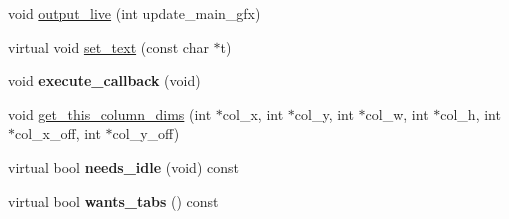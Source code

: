 \begin{DoxyCompactItemize}
\item 
void \hyperlink{class_g_l_u_i___control_ac7417112964d4c5134d4453835a0da99}{output\+\_\+live} (int update\+\_\+main\+\_\+gfx)
\item 
virtual void \hyperlink{class_g_l_u_i___control_a44fab5a8af3c58865bc2cd8bfd596af8}{set\+\_\+text} (const char $\ast$t)
\item 
\hypertarget{class_g_l_u_i___control_a76fe9cee85c7a296610a73b0ba12aa9c}{void {\bfseries execute\+\_\+callback} (void)}\label{class_g_l_u_i___control_a76fe9cee85c7a296610a73b0ba12aa9c}

\item 
void \hyperlink{class_g_l_u_i___control_a0cb273fd3dca9fb84809a4d350668c32}{get\+\_\+this\+\_\+column\+\_\+dims} (int $\ast$col\+\_\+x, int $\ast$col\+\_\+y, int $\ast$col\+\_\+w, int $\ast$col\+\_\+h, int $\ast$col\+\_\+x\+\_\+off, int $\ast$col\+\_\+y\+\_\+off)
\item 
\hypertarget{class_g_l_u_i___control_aab6d8bb823a01dc13892e68b796ef29c}{virtual bool {\bfseries needs\+\_\+idle} (void) const }\label{class_g_l_u_i___control_aab6d8bb823a01dc13892e68b796ef29c}

\item 
\hypertarget{class_g_l_u_i___control_a42a65c9dbc0690e270a8c0033fbc1845}{virtual bool {\bfseries wants\+\_\+tabs} () const }\label{class_g_l_u_i___control_a42a65c9dbc0690e270a8c0033fbc1845}

\end{DoxyCompactItemize}
